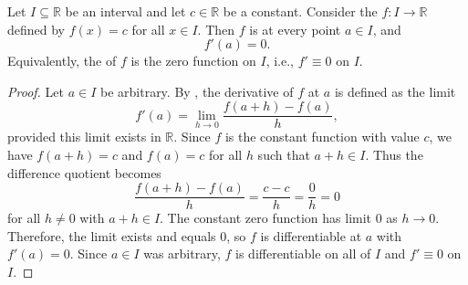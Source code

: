\begin{proposition} \label{proposition:derivative_of_a_real_constant_function_on_a_real_interval_is_zero}
    Let $I \subseteq \mathbb{R}$ be an interval and let $c \in \mathbb{R}$ be a constant. Consider the  $f : I \to \mathbb{R}$ defined by $f(x) = c$ for all $x \in I$. Then $f$ is  at every point $a \in I$, and
    $$f'(a) = 0.$$
    Equivalently, the  of $f$ is the zero function on $I$, i.e., $f' \equiv 0$ on $I$.
\end{proposition}
\begin{proof}
    Let $a \in I$ be arbitrary. By , the derivative of $f$ at $a$ is defined as the limit
    $$f'(a) = \lim_{h \to 0} \frac{f(a+h) - f(a)}{h},$$
    provided this limit exists in $\mathbb{R}$. Since $f$ is the constant function with value $c$, we have $f(a+h) = c$ and $f(a) = c$ for all $h$ such that $a+h \in I$. Thus the difference quotient becomes
    $$\frac{f(a+h) - f(a)}{h} = \frac{c - c}{h} = \frac{0}{h} = 0$$
    for all $h \neq 0$ with $a+h \in I$. The constant zero function has limit $0$ as $h \to 0$. Therefore, the limit exists and equals $0$, so $f$ is differentiable at $a$ with $f'(a) = 0$. Since $a \in I$ was arbitrary, $f$ is differentiable on all of $I$ and $f' \equiv 0$ on $I$.
\end{proof}